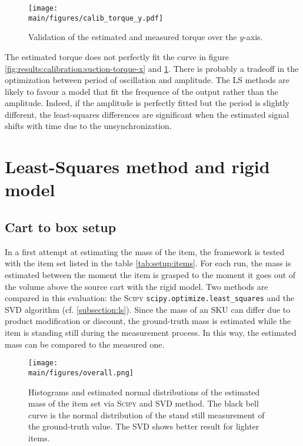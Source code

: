 \documentclass[/home/francois/latex/report/main.tex]{subfiles}
\begin{document}
\begin{figure}[h]
  \centering
  \texttt{[image: \\main/figures/calib\_torque\_y.pdf]}
  \caption{Validation of the estimated and measured torque over the $y$-axis.}
  \label{fig:results:calibration:suction-torque-y}
\end{figure}

The estimated torque does not perfectly fit the curve in figure \ref{fig:results:calibration:suction-torque-x} and \ref{fig:results:calibration:suction-torque-y}. There is probably a tradeoff in the optimization between period of oscillation and amplitude. The \ac{LS} methods are likely to favour a model that fit the frequence of the output rather than the amplitude. Indeed, if the amplitude is perfectly fitted but the period is slightly different, the least-squares differences are significant when the estimated signal shifts with time due to the unsynchronization.

\section{Least-Squares method and rigid model}

\subsection{Cart to box setup}

In a first attempt at estimating the mass of the item, the framework is tested with the item set listed in the table \ref{tab:setup:items}. For each run, the mass is estimated between the moment the item is grasped to the moment it goes out of the volume above the source cart with the rigid model. Two methods are compared in this evaluation: the \textsc{Scipy} \texttt{scipy.optimize.least\_squares} and the \ac{SVD} algorithm (cf. \ref{subsection:ls}). Since the mass of an \ac{SKU} can differ due to product modification or discount, the ground-truth mass is estimated while the item is standing still during the measurement process. In this way, the estimated mass can be compared to the measured one.

\begin{figure}[H]
  \centering
  \texttt{[image: \\main/figures/overall.png]}
  \caption{Histograms and estimated normal distributions of the estimated mass of the item set via \textsc{Scipy} and \ac{SVD} method. The black bell curve is the normal distribution of the stand still measurement of the ground-truth value. The \ac{SVD} shows better result for lighter items.}
  \label{fig:results:rigid-ls}
\end{figure}
\end{document}
